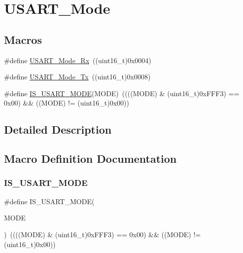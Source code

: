 \hypertarget{group___u_s_a_r_t___mode}{}\section{U\+S\+A\+R\+T\+\_\+\+Mode}
\label{group___u_s_a_r_t___mode}
\subsection*{Macros}
\begin{DoxyCompactItemize}
\item 
\#define \mbox{\hyperlink{group___u_s_a_r_t___mode_gafefcc3d3c1a1f83b425784fa6289aecf}{U\+S\+A\+R\+T\+\_\+\+Mode\+\_\+\+Rx}}~((uint16\+\_\+t)0x0004)
\item 
\#define \mbox{\hyperlink{group___u_s_a_r_t___mode_ga22b2813509a062435ea68d086ec565b4}{U\+S\+A\+R\+T\+\_\+\+Mode\+\_\+\+Tx}}~((uint16\+\_\+t)0x0008)
\item 
\#define \mbox{\hyperlink{group___u_s_a_r_t___mode_gae9140e5ca405d2377fe0e82c79e136a2}{I\+S\+\_\+\+U\+S\+A\+R\+T\+\_\+\+M\+O\+DE}}(M\+O\+DE)~((((M\+O\+DE) \& (uint16\+\_\+t)0x\+F\+F\+F3) == 0x00) \&\& ((\+M\+O\+D\+E) != (uint16\+\_\+t)0x00))
\end{DoxyCompactItemize}


\subsection{Detailed Description}


\subsection{Macro Definition Documentation}
\mbox{\label{group___u_s_a_r_t___mode_gae9140e5ca405d2377fe0e82c79e136a2}} 
\subsubsection{\texorpdfstring{IS\_USART\_MODE}{IS\_USART\_MODE}}
{\footnotesize\ttfamily \#define I\+S\+\_\+\+U\+S\+A\+R\+T\+\_\+\+M\+O\+DE(\begin{DoxyParamCaption}\item[{}]{M\+O\+DE }\end{DoxyParamCaption})~((((M\+O\+DE) \& (uint16\+\_\+t)0x\+F\+F\+F3) == 0x00) \&\& ((\+M\+O\+D\+E) != (uint16\+\_\+t)0x00))}

